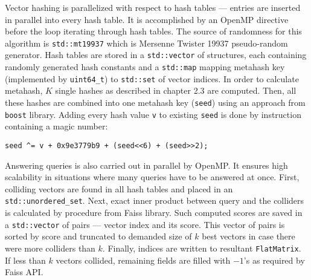Vector hashing is parallelized with respect to hash tables --- entries are inserted in parallel
into every hash table. It is accomplished by an OpenMP directive before the loop iterating through
hash tables.
The source of randomness for this algorithm is \texttt{std::mt19937} which is Mersenne
Twister 19937 pseudo-random generator.
Hash tables are stored in a \texttt{std::vector} of structures, each containing
randomly generated hash constants and a \texttt{std::map} mapping
metahash key (implemented by \texttt{uint64_t}) to \texttt{std::set} of vector indices.
In order to calculate metahash, $K$ single hashes as described in chapter 2.3 are computed.
Then, all these hashes are combined into one metahash key (\texttt{seed}) using an approach from
\texttt{boost} library. Adding every hash value \texttt{v} to existing \texttt{seed} is done
by instruction containing a magic number:
\begin{verbatim}
seed ^= v + 0x9e3779b9 + (seed<<6) + (seed>>2);
\end{verbatim}

Answering queries is also carried out in parallel by OpenMP. It ensures high scalability in situations
where many queries have to be answered at once. First, colliding vectors are found in all hash
tables and placed in an \texttt{std::unordered\_set}. Next, exact inner product between query and
the colliders is calculated by  procedure from Faiss library.
Such computed scores are saved in a \texttt{std::vector} of pairs --- vector index and its score.
This vector of pairs is sorted by score and truncated to demanded size of $k$ best vectors in case
there were more colliders than $k$. Finally, indices are written to resultant \texttt{FlatMatrix}.
If less than $k$ vectors collided, remaining fields are filled with $-1$'s as required by
Faiss API.

